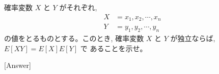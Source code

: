 確率変数 $X$ と $Y$ がそれぞれ,
\begin{align*}
X &= x_1, x_2, \cdots, x_n \\
Y &= y_1, y_2, \cdots, y_n
\end{align*}
の値をとるものとする。このとき, 確率変数 $X$ と $Y$ が独立ならば, $E[XY] = E[X]E[Y]$ で
あることを示せ。


[Answer]
